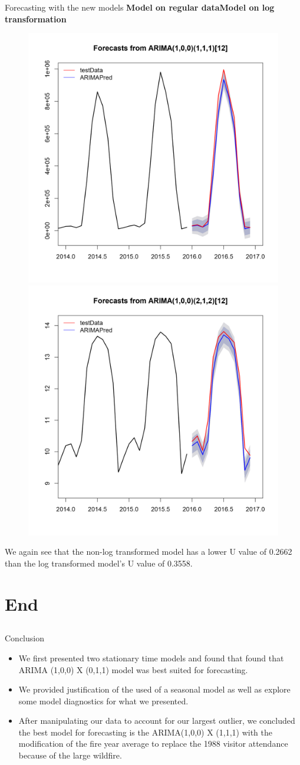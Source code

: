 \documentclass[xcolor=dvipsnames]{beamer}
\begin{document}
\begin{frame}{Forecasting with the new models}
\small{\textbf{Model on regular data}\hfill \textbf{Model on log transformation}}
\vspace{-1em}
\begin{figure}
\centering\includegraphics[width=.47\linewidth]{../outlier/forecastGOOD-fitV-plot-outlier.png} \hfill \centering\includegraphics[width=.47\linewidth]{../outlier/forecastGOOD-fitLV-plot-outlier.png}
\end{figure}

\vfill 
\footnotesize We again see that the non-log transformed model has a lower U value of 0.2662 than the log transformed model’s U value of 0.3558. 
\end{frame}

\section{End}

\subsection{}
\begin{frame}{Conclusion}
\begin{itemize}
\item We first presented two stationary time models and found that found that  ARIMA (1,0,0) X (0,1,1) model was best suited for forecasting.  
\item We provided justification of the used of a seasonal model as well as explore some model diagnostics for what we presented. 
\item After manipulating our data to account for our largest outlier, we concluded the best model for forecasting is the ARIMA(1,0,0) X (1,1,1) with the modification of the fire year average to replace the 1988 visitor attendance because of the large wildfire.  
\end{itemize}
\end{frame}
\end{document}
